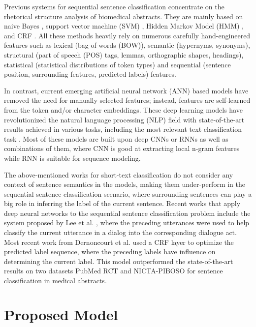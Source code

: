 \documentclass[11pt,a4paper]{article}
\begin{document}
Previous systems for sequential sentence classification concentrate on the rhetorical structure analysis of biomedical abstracts. They are mainly based on naive Bayes \cite{ruch2007using}, support vector machine (SVM) \cite{mcknight2003categorization,yamamoto2005sentence,liu2013abstract}, Hidden Markov Model (HMM) \cite{lin2006generative}, and CRF \cite{kim2011automatic,hassanzadeh2014identifying,hirohata2008identifying,chung2009sentence}. All these methods heavily rely on numerous carefully hand-engineered features such as lexical (bag-of-words (BOW)), semantic (hypernyms, synonyms), structural (part of speech (POS) tags, lemmas, orthographic shapes, headings), statistical (statistical distributions of token types) and sequential (sentence position, surrounding features, predicted labels) features. 


In contrast, current emerging artificial neural network (ANN) based models have removed the need for manually selected features; instead, features are self-learned from the token and/or character embeddings. These deep learning models have revolutionized the natural language processing (NLP) field with state-of-the-art results achieved in various tasks, including the most relevant text classification task \cite{kim2014convolutional,zhang2016dependency,conneau2017very,lai2015recurrent,joulin2016bag,ma2015dependency}. Most of these models are built upon deep CNNs or RNNs as well as  combinations of them, where CNN is good at extracting local n-gram features while RNN is suitable for sequence modeling.


The above-mentioned works for short-text classification do not consider any context of sentence semantics in the models, 
making them under-perform in the sequential sentence classification scenario, where surrounding sentences can play a big role in inferring the label of the current sentence. Recent works that apply deep neural networks to the sequential sentence classification problem include the system proposed by Lee et al. \cite{lee2016sequential}, where the preceding utterances were used to help classify the current utterance in a dialog into the corresponding dialogue act. Most recent work from Dernoncourt et al. \cite{dernoncourt2016neural} used a CRF layer to optimize the predicted label sequence, where the preceding labels have influence on determining the current label. This model outperformed the state-of-the-art results on two datasets PubMed RCT and NICTA-PIBOSO for sentence classification in medical abstracts.


\section{Proposed Model}
\end{document}
